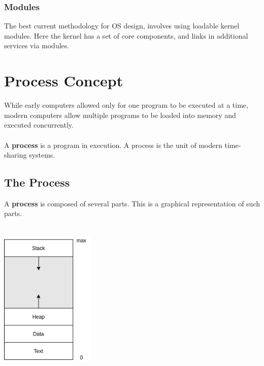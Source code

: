 \documentclass{article}
\begin{document}
\subsubsection{Modules}
The best current methodology for OS design, involves using loadable kernel modules. Here the kernel has a set of core components, and links in additional services via modules.

\section{Process Concept}

While early computers allowed only for one program to be executed at a time, modern computers allow multiple programs to be loaded into memory and executed concurrently. \\ \\
A \textbf{process} is a program in execution. A process is the unit of modern time-sharing systems.

\subsection{The Process}
A \textbf{process} is composed of several parts. This is a graphical representation of such parts. \\ \\

\centerline{\includegraphics[width=4.5cm]{./assets/process.png}}
\vspace{.5cm}
\end{document}
